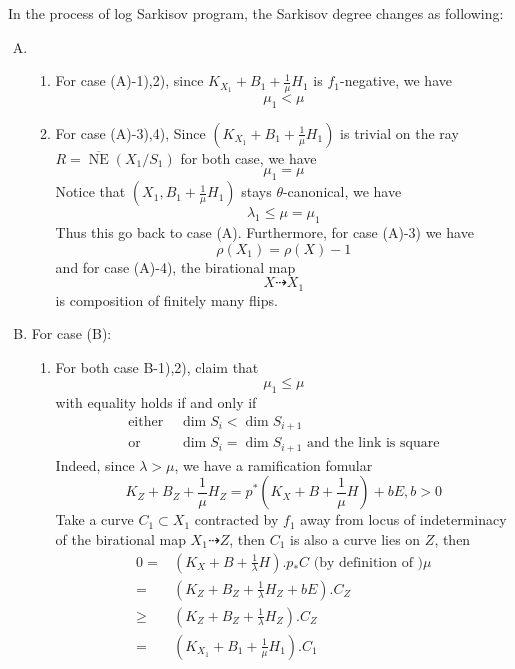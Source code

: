 \documentclass{article}
\begin{document}
In the process of log Sarkisov program, the Sarkisov degree changes as following:
\begin{enumerate}[(A)]
  \item 
  \begin{enumerate}[1)]
    \item For case (A)-1),2),  since $ K_{X_1}+B_1+\frac{1}{\mu}H_1 $ is $ f_1 $-negative, we have 
    \[ \mu_1<\mu \]
    \item For case (A)-3),4), Since $ (K_{X_1}+B_1+\frac{1}{\mu}H_1) $ is trivial on the ray $ R=\overline{\operatorname{NE}}(X_1/S_1) $ for both case, we have
    \[ \mu_1=\mu \]
    Notice that $ (X_1,B_1+\frac{1}{\mu}H_1) $ stays $ \theta $-canonical, we have
    \[ \lambda_1\leqslant \mu=\mu_1 \]
    Thus this go back to case (A). Furthermore,   for case (A)-3) we have
    \[ \rho(X_1)=\rho(X)-1 \]
    and for case (A)-4), the birational map
    \[ X\dashrightarrow X_1 \]
    is composition of finitely many flips.
  \end{enumerate} 
  \item For case (B): 
  \begin{enumerate}[1)]
    \item For both case B-1),2), claim that 
    \[ \mu_1\leqslant \mu \]
    with equality holds if and only if 
    \begin{equation*}
      \begin{aligned}
        \text{either } &\dim S_i<\dim S_{i+1} \\
        \text{or }&\dim S_i=\dim S_{i+1} \text{ and the link is square} 
      \end{aligned}
    \end{equation*} 
    Indeed, since $ \lambda>\mu $, we have a ramification fomular
    \[ K_Z+B_Z+\frac{1}{\mu}H_Z=p^*(K_X+B+\frac{1}{\mu}H)+bE, b>0 \]
    Take a curve $ C_1\subset X_1 $ contracted by $ f_1 $ away from locus of indeterminacy of the birational map $ X_1\dashrightarrow Z $, then $ C_1 $ is also a curve lies on $ Z $, then
    \begin{equation*}
      \begin{aligned}
        0=& (K_{X}+B+\frac{1}{\lambda}H).p_*C \text{ (by definition of )} \mu\\
        =&(K_{Z}+B_{Z}+\frac{1}{\lambda}H_Z+bE).C_{Z}\\
        \geqslant&(K_Z+B_Z+\frac{1}{\lambda}H_Z).C_Z\\
        =&(K_{X_1}+B_1+\frac{1}{\mu}H_1).C_1
      \end{aligned}
    \end{equation*} 

\end{enumerate}
\end{enumerate}
\end{document}

